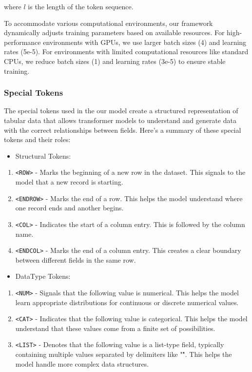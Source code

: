 \documentclass{article}
\begin{document}
where $l$ is the length of the token sequence.

To accommodate various computational environments, our framework dynamically adjusts training parameters based on available resources. For high-performance environments with GPUs, we use larger batch sizes (4) and learning rates (5e-5). For environments with limited computational resources like standard CPUs, we reduce batch sizes (1) and learning rates (3e-5) to ensure stable training.

\subsubsection[short]{Special Tokens}
The special tokens used in the our model create a structured representation of tabular data that allows transformer models to understand and generate data with the correct relationships between fields. Here's a summary of these special tokens and their roles:
\begin{itemize}
\item Structural Tokens:
\end{itemize}
\begin{enumerate}
        \item \texttt{<ROW>} - Marks the beginning of a new row in the dataset. This signals to the model that a new record is starting.
        \item \texttt{<ENDROW>} - Marks the end of a row. This helps the model understand where one record ends and another begins.
        \item \texttt{<COL>} - Indicates the start of a column entry. This is followed by the column name.
        \item \texttt{<ENDCOL>} - Marks the end of a column entry. This creates a clear boundary between different fields in the same row.
\end{enumerate}
\begin{itemize}
\item DataType Tokens:
\end{itemize}
\begin{enumerate}
        \item \texttt{<NUM>} - Signals that the following value is numerical. This helps the model learn appropriate distributions for continuous or discrete numerical values.
        \item \texttt{<CAT>} - Indicates that the following value is categorical. This helps the model understand that these values come from a finite set of possibilities.
        \item \texttt{<LIST>} - Denotes that the following value is a list-type field, typically containing multiple values separated by delimiters like "\^". This helps the model handle more complex data structures.
\end{enumerate}
\end{document}
